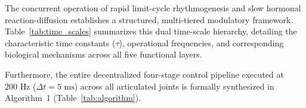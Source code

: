 \documentclass{iopjournal}
\begin{document}
The concurrent operation of rapid limit-cycle rhythmogenesis and slow hormonal reaction-diffusion establishes a structured, multi-tiered modulatory framework. Table~\ref{tab:time_scales} summarizes this dual time-scale hierarchy, detailing the characteristic time constants ($\tau$), operational frequencies, and corresponding biological mechanisms across all five functional layers.

Furthermore, the entire decentralized four-stage control pipeline executed at $200\text{ Hz}$ ($\Delta t = 5\text{ ms}$) across all articulated joints is formally synthesized in Algorithm~1 (Table~\ref{tab:algorithm}).

\begin{table}[htbp]
\centering
\caption{Dual Time-Scale Modulatory Hierarchy in AHM-CPG Snake Locomotion.}
\label{tab:time_scales}
\end{table}
\end{document}
